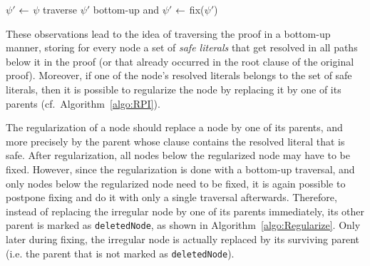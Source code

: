 \IncMargin{0.5em}
\begin{algorithm}[b]
\begin{footnotesize}


\BlankLine

$\psi'$ $\leftarrow$ $\psi$\;
traverse $\psi'$ bottom-up and 
$\psi'$ $\leftarrow$ fix($\psi'$) \;
\;
\caption{\label{algo:RPI} \texttt{\RPI}}
\end{footnotesize}
\end{algorithm}
\DecMargin{0.5em}

These observations lead to the idea of traversing the proof in a bottom-up
manner, storing for every node a set of \emph{safe literals} that get resolved
in all paths below it in the proof (or that already occurred in the root clause
of the original proof). Moreover, if one of the node's resolved literals belongs
to the set of safe literals, then it is possible to regularize the node by
replacing it by one of its parents (cf.\ Algorithm~\ref{algo:RPI}). 

The regularization of a node should replace a node by one of its parents, and more precisely by the parent whose clause contains the resolved literal that is safe. After regularization, all nodes below the regularized node may have to be fixed. However, since the regularization is done with a bottom-up traversal, and only nodes below the regularized node need to be fixed, it is again possible to postpone fixing and do it with only a single traversal afterwards. 
Therefore, instead of replacing the irregular node by one of its parents immediately, 
its other parent is marked as \texttt{deletedNode}, as shown in Algorithm~\ref{algo:Regularize}. Only later during fixing, 
the irregular node is actually replaced by its surviving parent (i.e. the parent that is not marked as \texttt{deletedNode}).



